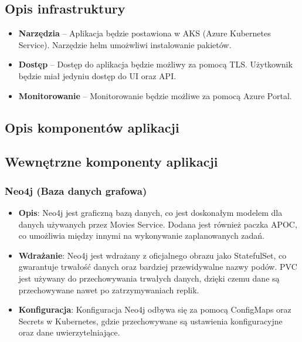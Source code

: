 \documentclass[12pt,a4paper]{article}
\begin{document}
\subsection{Opis infrastruktury}
\label{sec:Users}

\begin{itemize}
  \item \textbf{Narzędzia} -- Aplikacja będzie postawiona w AKS (Azure Kubernetes Service). Narzędzie helm umożwliwi instalowanie pakietów.
  \item \textbf{Dostęp} -- Dostęp do aplikacja będzie możliwy za pomocą TLS. Użytkownik będzie miał jedyniu dostęp do UI oraz API.
  \item \textbf{Monitorowanie} -- Monitorowanie będzie możliwe za pomocą Azure Portal.
\end{itemize}

\subsection{Opis komponentów aplikacji}
\label{sec:FunctionalConditions}

\subsection{Wewnętrzne komponenty aplikacji}

\subsubsection{Neo4j (Baza danych grafowa)}
\begin{itemize}
    \item \textbf{Opis}: Neo4j jest graficzną bazą danych, co jest doskonałym modelem dla danych używanych przez Movies Service. Dodana jest również paczka APOC, co umożliwia między innymi na wykonywanie zaplanowanych zadań.
    \item \textbf{Wdrażanie}: Neo4j jest wdrażany z oficjalnego obrazu jako StatefulSet, co gwarantuje trwałość danych oraz bardziej przewidywalne nazwy podów. PVC jest używany do przechowywania trwałych danych, dzięki czemu dane są przechowywane nawet po zatrzymywaniach replik.
    \item \textbf{Konfiguracja}: Konfiguracja Neo4j odbywa się za pomocą ConfigMaps oraz Secrets w Kubernetes, gdzie przechowywane są ustawienia konfiguracyjne oraz dane uwierzytelniające.
\end{itemize}
\end{document}
